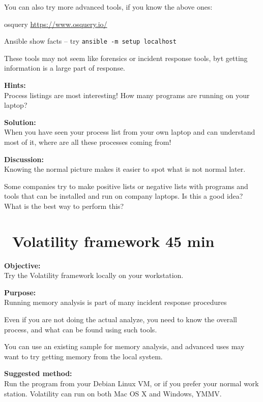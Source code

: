 \documentclass[a4paper,11pt,notitlepage]{report}
\begin{document}
You can also try more advanced tools, if you know the above ones:
\begin{list2}
\item osquery \url{https://www.osquery.io/}
\item Ansible show facts -- try \verb+ansible -m setup localhost+
\end{list2}

These tools may not seem like forensics or incident response tools, byt getting information is a large part of response.



{\bf Hints:}\\
Process listings are most interesting! How many programs are running on your laptop?



{\bf Solution:}\\
When you have seen your process list from your own laptop and can understand most of it, where are all these processes coming from!

{\bf Discussion:}\\
Knowing the normal picture makes it easier to spot what is not normal later.

Some companies try to make positive lists or negative lists with programs and tools that can be installed and run on company laptops. Is this a good idea? What is the best way to perform this?






\chapter{\faExclamationTriangle\ Volatility framework 45 min}
\label{ex:volatility-install}

{\bf Objective:}\\
Try the Volatility framework locally on your workstation.


{\bf Purpose:}\\
Running memory analysis is part of many incident response procedures

Even if you are not doing the actual analyze, you need to know the overall process, and what can be found using such tools.

You can use an existing sample for memory analysis, and advanced uses may want to try getting memory from the local system.

{\bf Suggested method:}\\
Run the program from your Debian Linux VM, or if you prefer your normal work station. Volatility can run on both Mac OS X and Windows, YMMV.
\end{document}
